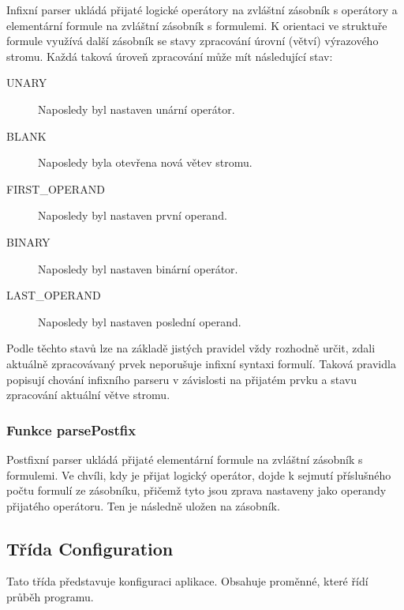 \documentclass[thesis=B,czech,hidelinks]{thesis}[2012/06/26]
\begin{document}
Infixní parser ukládá přijaté logické operátory na zvláštní zásobník s operátory a elementární formule na zvláštní zásobník s formulemi. K orientaci ve struktuře formule využívá další zásobník se stavy zpracování úrovní (větví) výrazového stromu. Každá taková úroveň zpracování může mít následující stav:

\begin{description}
	\item[UNARY] Naposledy byl nastaven unární operátor. 
	\item[BLANK] Naposledy byla otevřena nová větev stromu.
	\item[FIRST\_OPERAND] Naposledy byl nastaven první operand.
	\item[BINARY] Naposledy byl nastaven binární operátor.
	\item[LAST\_OPERAND] Naposledy byl nastaven poslední operand.
\end{description}

Podle těchto stavů lze na základě jistých pravidel vždy rozhodně určit, zdali aktuálně zpracovávaný prvek neporušuje infixní syntaxi formulí. Taková pravidla popisují chování infixního parseru v závislosti na přijatém prvku a stavu zpracování aktuální větve stromu.

\subsubsection{Funkce parsePostfix}

Postfixní parser ukládá přijaté elementární formule na zvláštní zásobník s formulemi. Ve chvíli, kdy je přijat logický operátor, dojde k sejmutí příslušného počtu formulí ze zásobníku, přičemž tyto jsou zprava nastaveny jako operandy přijatého operátoru. Ten je následně uložen na zásobník.





















\subsection{Třída Configuration}

Tato třída představuje konfiguraci aplikace. Obsahuje proměnné, které řídí průběh programu.
\end{document}
